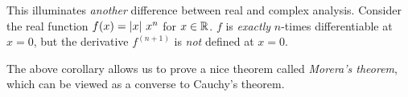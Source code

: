 \begin{remark}
    This illuminates \emph{another} difference between real and complex analysis.
    Consider the real function $f(x) = \left\lvert x\right\rvert \, x^n$ for $x \in \mathbb{R}$.
    $f$ is \emph{exactly} $n$-times differentiable at $x = 0$, but the derivative
    $f^{(n+1)}$ is \emph{not} defined at $x = 0$.
\end{remark}

The above corollary allows us to prove a nice theorem called \emph{Morera's theorem},
which can be viewed as a converse to Cauchy's theorem.
